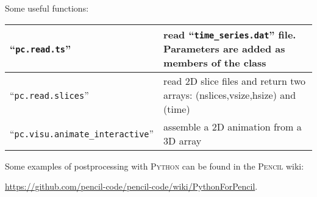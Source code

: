 \documentclass[a4paper,12pt]{article}
\newcommand{\file}[1]{``\texttt{#1}''}
\newcommand{\name}[1]{\textsc{#1}}
\begin{document}
Some useful functions:
\begin{center}
\begin{tabular}{|l|l|}\hline
\file{pc.read.ts} & read \file{time\_series.dat} file. Parameters are added as 
members of the class\\\hline
\file{pc.read.slices} & read 2D slice files and return two arrays: 
(nslices,vsize,hsize) and (time)\\\hline
\file{pc.visu.animate\_interactive} & assemble a 2D animation from a 3D 
array\\\hline
\end{tabular}
\end{center}

Some examples of postprocessing with \name{Python} can be found in the 
\name{Pencil} wiki:


\url{https://github.com/pencil-code/pencil-code/wiki/PythonForPencil}.

% 
\end{document}
